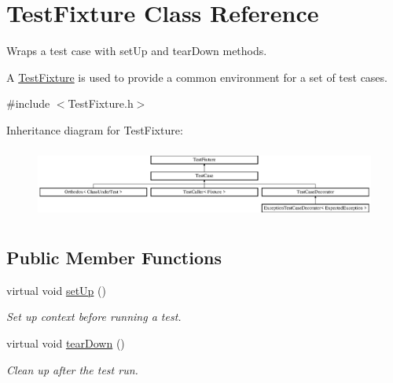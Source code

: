 \hypertarget{class_test_fixture}{\section{Test\-Fixture Class Reference}
\label{class_test_fixture}
}


Wraps a test case with set\-Up and tear\-Down methods.

A \hyperlink{class_test_fixture}{Test\-Fixture} is used to provide a common environment for a set of test cases.  




{\ttfamily \#include $<$Test\-Fixture.\-h$>$}

Inheritance diagram for Test\-Fixture\-:\begin{figure}[H]
\begin{center}
\leavevmode
\includegraphics[height=2.370370cm]{class_test_fixture}
\end{center}
\end{figure}
\subsection*{Public Member Functions}
\begin{DoxyCompactItemize}
\item 
\hypertarget{class_test_fixture_a0e77590b14a3ec7f93fe02e5b89a242f}{virtual void \hyperlink{class_test_fixture_a0e77590b14a3ec7f93fe02e5b89a242f}{set\-Up} ()}\label{class_test_fixture_a0e77590b14a3ec7f93fe02e5b89a242f}

\begin{DoxyCompactList}\small\item\em Set up context before running a test. \end{DoxyCompactList}\item 
\hypertarget{class_test_fixture_a707dd4d7d0910af916343d79c0feffc9}{virtual void \hyperlink{class_test_fixture_a707dd4d7d0910af916343d79c0feffc9}{tear\-Down} ()}\label{class_test_fixture_a707dd4d7d0910af916343d79c0feffc9}

\begin{DoxyCompactList}\small\item\em Clean up after the test run. \end{DoxyCompactList}\end{DoxyCompactItemize}


